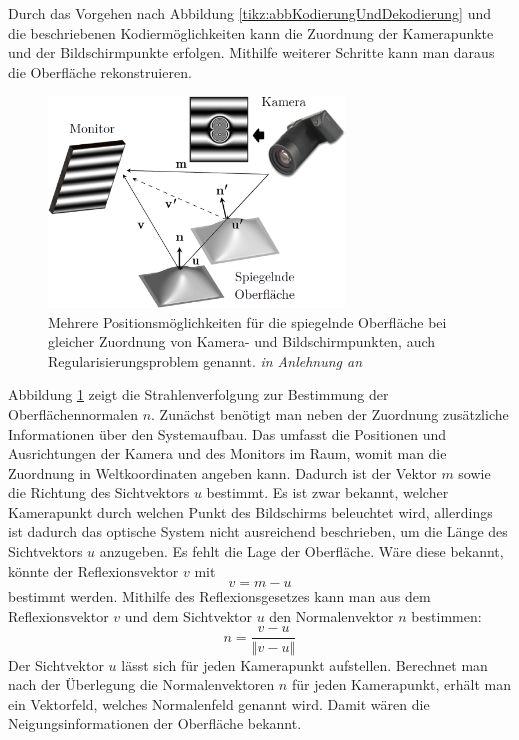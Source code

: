 Durch das Vorgehen nach Abbildung \ref{tikz:abbKodierungUndDekodierung} und die beschriebenen Kodiermöglichkeiten kann die Zuordnung der Kamerapunkte und der Bildschirmpunkte erfolgen.
Mithilfe weiterer Schritte kann man daraus die Oberfläche rekonstruieren.
%
\begin{figure}[H]
	\centering
	\includegraphics[width=0.7\textwidth]{02_grundlagenDerDeflektometrie/rekonstruktion/rekonstruktionUndRegularisierungsproblem/figures/regularisierungsproblem}
	\caption[Regularisierungsproblem]{Mehrere Positionsmöglichkeiten für die spiegelnde Oberfläche bei gleicher Zuordnung von Kamera- und Bildschirmpunkten, auch Regularisierungsproblem genannt. \textit{in Anlehnung an} \cite{stereoDeflektometrie}}
	\label{img:regularisierungsproblem}
\end{figure}
%
\noindent
Abbildung \ref{img:regularisierungsproblem} zeigt die Strahlenverfolgung zur Bestimmung der Oberflächennormalen $n$.
Zunächst benötigt man neben der Zuordnung zusätzliche Informationen über den Systemaufbau.
Das umfasst die Positionen und Ausrichtungen der Kamera und des Monitors im Raum, womit man die Zuordnung in Weltkoordinaten angeben kann.
Dadurch ist der Vektor $m$ sowie die Richtung des Sichtvektors $u$ bestimmt.
Es ist zwar bekannt, welcher Kamerapunkt durch welchen Punkt des Bildschirms beleuchtet wird, allerdings ist dadurch das optische System nicht ausreichend beschrieben, um die Länge des Sichtvektors $u$ anzugeben.
Es fehlt die Lage der Oberfläche.
Wäre diese bekannt, könnte der Reflexionsvektor $v$ mit 
\begin{equation*}
	v = m - u
\end{equation*}
bestimmt werden.
Mithilfe des Reflexionsgesetzes kann man aus dem Reflexionsvektor $v$ und dem Sichtvektor $u$ den Normalenvektor $n$ bestimmen:
%
\begin{equation}
	n = \dfrac{v - u}{\left\Vert v - u \right\Vert}
\end{equation}
%
Der Sichtvektor $u$ lässt sich für jeden Kamerapunkt aufstellen.
Berechnet man nach der Überlegung die Normalenvektoren $n$ für jeden Kamerapunkt, erhält man ein Vektorfeld, welches Normalenfeld genannt wird.
Damit wären die Neigungsinformationen der Oberfläche bekannt.

